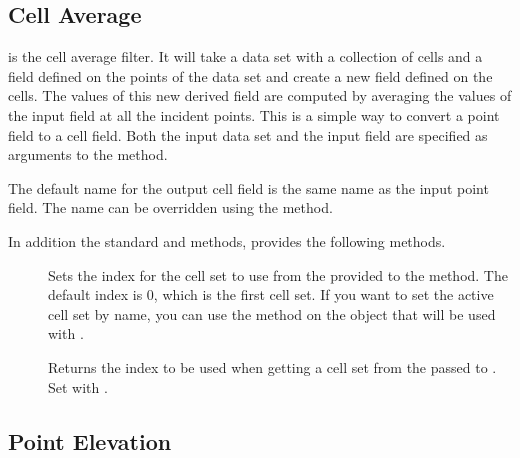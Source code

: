 
\subsection{Cell Average}


 is the cell average filter. It will take a data
set with a collection of cells and a field defined on the points of the
data set and create a new field defined on the cells. The values of this
new derived field are computed by averaging the values of the input field
at all the incident points. This is a simple way to convert a point field
to a cell field. Both the input data set and the input field are specified
as arguments to the  method.

The default name for the output cell field is the same name as the input
point field. The name can be overridden using the
 method.

In addition the standard  and
 methods,  provides the
following methods.

\begin{description}
\item[] Sets the index for the cell set to use
  from the  provided to the 
  method. The default index is 0, which is the first cell set. If you want
  to set the active cell set by name, you can use the
   method on the 
  object that will be used with .
\item[] Returns the index to be used when
  getting a cell set from the  passed to
  . Set with .
\end{description}


\subsection{Point Elevation}


